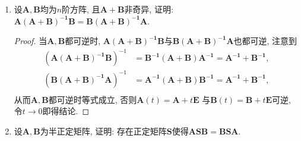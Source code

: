 \begin{3b}
\begin{enumerate}
\begin{proof}
\end{proof}
\item 设\(\boldsymbol{A},\boldsymbol{B}\)均为\(n\)阶方阵, 且\(\boldsymbol{A+B}\)非奇异, 证明: \(\boldsymbol{A(A+B)^{-1}B=B(A+B)^{-1}A}.\)
\begin{proof}
当\(\boldsymbol{A},\boldsymbol{B}\)都可逆时, \(\boldsymbol{A(A+B)^{-1}B}\)与\(\boldsymbol{B(A+B)^{-1}A}\)也都可逆, 注意到\[\begin{aligned}
\left(\boldsymbol{A(A+B)^{-1}B}\right)^{-1}&=\boldsymbol{B^{-1}}(\boldsymbol{A+B})\boldsymbol{A^{-1}}=\boldsymbol{A^{-1}}+\boldsymbol{B^{-1}},\\
\left(\boldsymbol{B(A+B)^{-1}A}\right)^{-1}&=\boldsymbol{A^{-1}}(\boldsymbol{A+B})\boldsymbol{B^{-1}}=\boldsymbol{A^{-1}}+\boldsymbol{B^{-1}},\\
\end{aligned}\]从而\(\boldsymbol{A},\boldsymbol{B}\)都可逆时等式成立, 
否则\(\boldsymbol{A}(t)=\boldsymbol{A}+t\boldsymbol{E}\)
与\(\boldsymbol{B}(t)=\boldsymbol{B}+t\boldsymbol{E}\)可逆, 
令\(t\rightarrow 0\)即得结论.
\end{proof}
\item 设\(\boldsymbol{A},\boldsymbol{B}\)为半正定矩阵, 
证明: 存在正定矩阵\(\boldsymbol{S}\)使得\(\boldsymbol{ASB}=\boldsymbol{BSA}.\)


\end{enumerate}
\end{3b}
